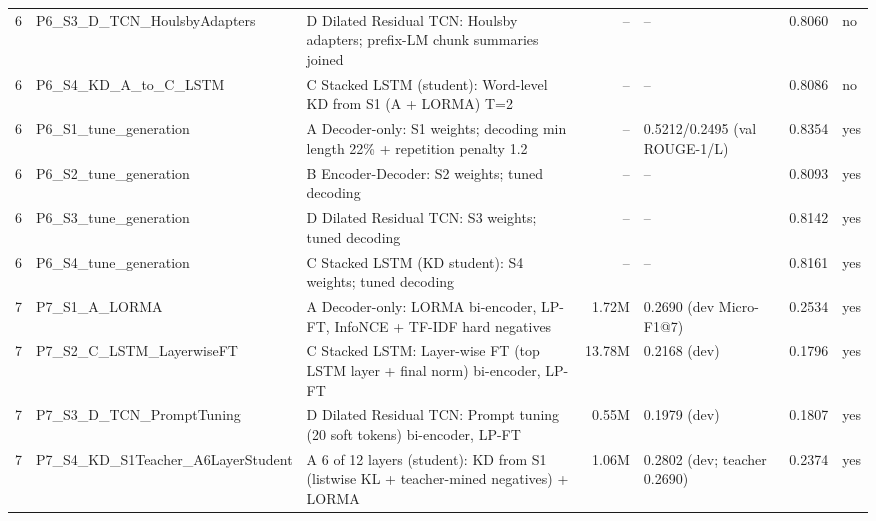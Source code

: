 \begin{longtable}{@{}l p{4.1cm} p{5.2cm} r p{3.0cm} r l@{}}
6 & P6\_S3\_D\_TCN\_HoulsbyAdapters & D Dilated Residual TCN: Houlsby adapters; prefix-LM chunk summaries joined & -- & -- & 0.8060 & no \\
6 & P6\_S4\_KD\_A\_to\_C\_LSTM & C Stacked LSTM (student): Word-level KD from S1 (A + LORMA) T=2 & -- & -- & 0.8086 & no \\
6 & P6\_S1\_tune\_generation & A Decoder-only: S1 weights; decoding min length 22\% + repetition penalty 1.2 & -- & 0.5212/0.2495 (val ROUGE-1/L) & 0.8354 & yes \\
6 & P6\_S2\_tune\_generation & B Encoder-Decoder: S2 weights; tuned decoding & -- & -- & 0.8093 & yes \\
6 & P6\_S3\_tune\_generation & D Dilated Residual TCN: S3 weights; tuned decoding & -- & -- & 0.8142 & yes \\
6 & P6\_S4\_tune\_generation & C Stacked LSTM (KD student): S4 weights; tuned decoding & -- & -- & 0.8161 & yes \\
7 & P7\_S1\_A\_LORMA & A Decoder-only: LORMA bi-encoder, LP-FT, InfoNCE + TF-IDF hard negatives & 1.72M & 0.2690 (dev Micro-F1@7) & 0.2534 & yes \\
7 & P7\_S2\_C\_LSTM\_LayerwiseFT & C Stacked LSTM: Layer-wise FT (top LSTM layer + final norm) bi-encoder, LP-FT & 13.78M & 0.2168 (dev) & 0.1796 & yes \\
7 & P7\_S3\_D\_TCN\_PromptTuning & D Dilated Residual TCN: Prompt tuning (20 soft tokens) bi-encoder, LP-FT & 0.55M & 0.1979 (dev) & 0.1807 & yes \\
7 & P7\_S4\_KD\_S1Teacher\_A6LayerStudent & A 6 of 12 layers (student): KD from S1 (listwise KL + teacher-mined negatives) + LORMA & 1.06M & 0.2802 (dev; teacher 0.2690) & 0.2374 & yes \\
\end{longtable}
